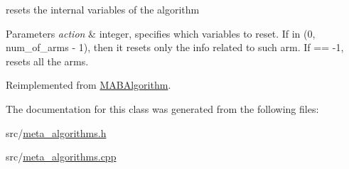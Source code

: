 resets the internal variables of the algorithm 


\begin{DoxyParams}{Parameters}
{\em action} & integer, specifies which variables to reset. If in (0, num\+\_\+of\+\_\+arms -\/ 1), then it resets only the info related to such arm. If == -\/1, resets all the arms. \\
\hline
\end{DoxyParams}


Reimplemented from \mbox{\hyperlink{class_m_a_b_algorithm_ad5761cee0b0e3421d1f043dbcc0b5f85}{M\+A\+B\+Algorithm}}.



The documentation for this class was generated from the following files\+:\begin{DoxyCompactItemize}
\item 
src/\mbox{\hyperlink{meta__algorithms_8h}{meta\+\_\+algorithms.\+h}}\item 
src/\mbox{\hyperlink{meta__algorithms_8cpp}{meta\+\_\+algorithms.\+cpp}}\end{DoxyCompactItemize}
